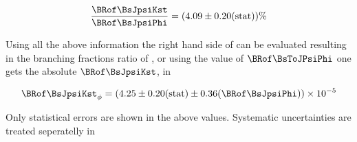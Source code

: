 \begin{equation}
\frac{\BRof\BsJpsiKst}{\BRof\BsJpsiPhi} = (4.09 \pm 0.20 ({\rm stat}) )\% \\
\label{norm_jpsiPhi_result}
\end{equation}

\noindent Using all the above information the right hand side of  can be evaluated resulting in 
the branching fractions ratio of , or using the value of $\BRof\BsToJPsiPhi$ 
one gets the absolute $\BRof\BsJpsiKst$, in 

\begin{equation}
\label{Br_JpsiPhi}
\BRof\BsJpsiKst_{\phi} = (4.25 \pm 0.20  \text{(stat)} \pm 0.36 (\BRof\BsJpsiPhi))\times 10^{-5}
\end{equation}

\noindent Only statistical errors are shown in the above values. Systematic uncertainties are treated seperatelly in 


